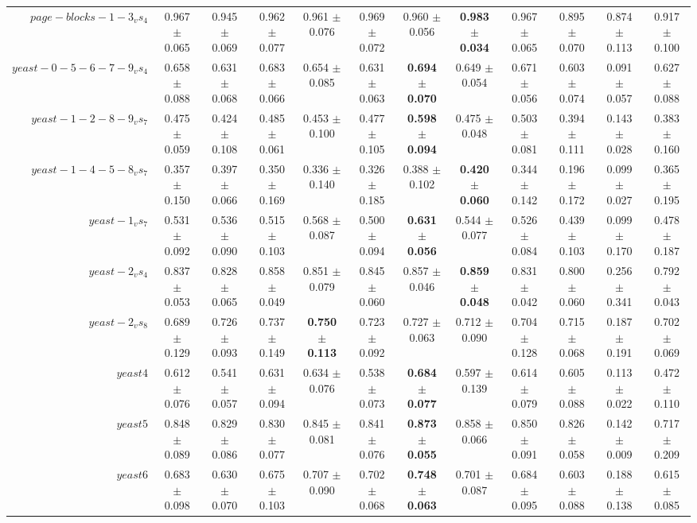 \begin{table}[!ht]
{\begin{tabular}{r c c c c c c c c c c c}
$page-blocks-1-3_vs_4$ & 0.967 $\pm$ 0.065 & 0.945 $\pm$ 0.069 & 0.962 $\pm$ 0.077 & 0.961 $\pm$ 0.076 & 0.969 $\pm$ 0.072 & 0.960 $\pm$ 0.056 & \textbf{0.983 $\pm$ 0.034} & 0.967 $\pm$ 0.065 & 0.895 $\pm$ 0.070 & 0.874 $\pm$ 0.113 & 0.917 $\pm$ 0.100 \\
$yeast-0-5-6-7-9_vs_4$ & 0.658 $\pm$ 0.088 & 0.631 $\pm$ 0.068 & 0.683 $\pm$ 0.066 & 0.654 $\pm$ 0.085 & 0.631 $\pm$ 0.063 & \textbf{0.694 $\pm$ 0.070} & 0.649 $\pm$ 0.054 & 0.671 $\pm$ 0.056 & 0.603 $\pm$ 0.074 & 0.091 $\pm$ 0.057 & 0.627 $\pm$ 0.088 \\
$yeast-1-2-8-9_vs_7$ & 0.475 $\pm$ 0.059 & 0.424 $\pm$ 0.108 & 0.485 $\pm$ 0.061 & 0.453 $\pm$ 0.100 & 0.477 $\pm$ 0.105 & \textbf{0.598 $\pm$ 0.094} & 0.475 $\pm$ 0.048 & 0.503 $\pm$ 0.081 & 0.394 $\pm$ 0.111 & 0.143 $\pm$ 0.028 & 0.383 $\pm$ 0.160 \\
$yeast-1-4-5-8_vs_7$ & 0.357 $\pm$ 0.150 & 0.397 $\pm$ 0.066 & 0.350 $\pm$ 0.169 & 0.336 $\pm$ 0.140 & 0.326 $\pm$ 0.185 & 0.388 $\pm$ 0.102 & \textbf{0.420 $\pm$ 0.060} & 0.344 $\pm$ 0.142 & 0.196 $\pm$ 0.172 & 0.099 $\pm$ 0.027 & 0.365 $\pm$ 0.195 \\
$yeast-1_vs_7$ & 0.531 $\pm$ 0.092 & 0.536 $\pm$ 0.090 & 0.515 $\pm$ 0.103 & 0.568 $\pm$ 0.087 & 0.500 $\pm$ 0.094 & \textbf{0.631 $\pm$ 0.056} & 0.544 $\pm$ 0.077 & 0.526 $\pm$ 0.084 & 0.439 $\pm$ 0.103 & 0.099 $\pm$ 0.170 & 0.478 $\pm$ 0.187 \\
$yeast-2_vs_4$ & 0.837 $\pm$ 0.053 & 0.828 $\pm$ 0.065 & 0.858 $\pm$ 0.049 & 0.851 $\pm$ 0.079 & 0.845 $\pm$ 0.060 & 0.857 $\pm$ 0.046 & \textbf{0.859 $\pm$ 0.048} & 0.831 $\pm$ 0.042 & 0.800 $\pm$ 0.060 & 0.256 $\pm$ 0.341 & 0.792 $\pm$ 0.043 \\
$yeast-2_vs_8$ & 0.689 $\pm$ 0.129 & 0.726 $\pm$ 0.093 & 0.737 $\pm$ 0.149 & \textbf{0.750 $\pm$ 0.113} & 0.723 $\pm$ 0.092 & 0.727 $\pm$ 0.063 & 0.712 $\pm$ 0.090 & 0.704 $\pm$ 0.128 & 0.715 $\pm$ 0.068 & 0.187 $\pm$ 0.191 & 0.702 $\pm$ 0.069 \\
$yeast4$ & 0.612 $\pm$ 0.076 & 0.541 $\pm$ 0.057 & 0.631 $\pm$ 0.094 & 0.634 $\pm$ 0.076 & 0.538 $\pm$ 0.073 & \textbf{0.684 $\pm$ 0.077} & 0.597 $\pm$ 0.139 & 0.614 $\pm$ 0.079 & 0.605 $\pm$ 0.088 & 0.113 $\pm$ 0.022 & 0.472 $\pm$ 0.110 \\
$yeast5$ & 0.848 $\pm$ 0.089 & 0.829 $\pm$ 0.086 & 0.830 $\pm$ 0.077 & 0.845 $\pm$ 0.081 & 0.841 $\pm$ 0.076 & \textbf{0.873 $\pm$ 0.055} & 0.858 $\pm$ 0.066 & 0.850 $\pm$ 0.091 & 0.826 $\pm$ 0.058 & 0.142 $\pm$ 0.009 & 0.717 $\pm$ 0.209 \\
$yeast6$ & 0.683 $\pm$ 0.098 & 0.630 $\pm$ 0.070 & 0.675 $\pm$ 0.103 & 0.707 $\pm$ 0.090 & 0.702 $\pm$ 0.068 & \textbf{0.748 $\pm$ 0.063} & 0.701 $\pm$ 0.087 & 0.684 $\pm$ 0.095 & 0.603 $\pm$ 0.088 & 0.188 $\pm$ 0.138 & 0.615 $\pm$ 0.085 \\

\end{tabular}}
\end{table}
